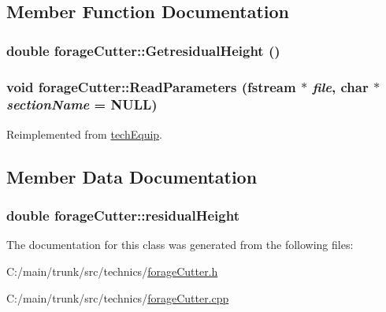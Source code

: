 \subsection{Member Function Documentation}
\hypertarget{classforage_cutter_a706720eb490008cdf8f154a348bdf82a}{
\subsubsection[{GetresidualHeight}]{\setlength{\rightskip}{0pt plus 5cm}double forageCutter::GetresidualHeight ()}}
\label{classforage_cutter_a706720eb490008cdf8f154a348bdf82a}
\hypertarget{classforage_cutter_af767727457025f83e708de8838a7beed}{
\subsubsection[{ReadParameters}]{\setlength{\rightskip}{0pt plus 5cm}void forageCutter::ReadParameters (fstream $\ast$ {\em file}, \/  char $\ast$ {\em sectionName} = {\ttfamily NULL})}}
\label{classforage_cutter_af767727457025f83e708de8838a7beed}


Reimplemented from \hyperlink{classtech_equip_a7b8543a8ead2be2a6a00d80123895e2c}{techEquip}.

\subsection{Member Data Documentation}
\hypertarget{classforage_cutter_a80ba26c9181973df976c006c66d1eb54}{
\subsubsection[{residualHeight}]{\setlength{\rightskip}{0pt plus 5cm}double {\bf forageCutter::residualHeight}}}
\label{classforage_cutter_a80ba26c9181973df976c006c66d1eb54}


The documentation for this class was generated from the following files:\begin{DoxyCompactItemize}
\item 
C:/main/trunk/src/technics/\hyperlink{forage_cutter_8h}{forageCutter.h}\item 
C:/main/trunk/src/technics/\hyperlink{forage_cutter_8cpp}{forageCutter.cpp}\end{DoxyCompactItemize}
